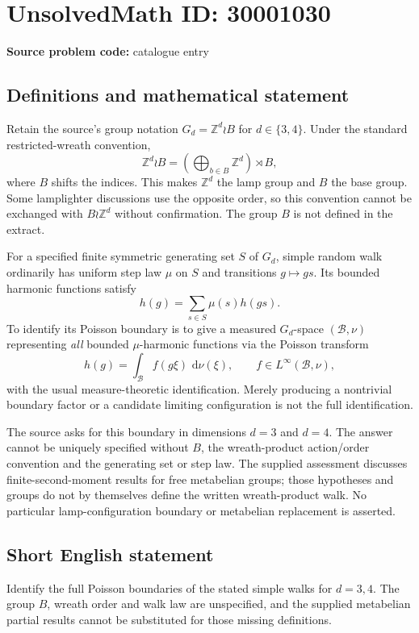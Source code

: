 \documentclass[11pt]{article}
\newcommand{\Z}{\mathbb{Z}}
\newcommand{\dd}{\,\mathrm{d}}
\begin{document}
\section*{UnsolvedMath ID: 30001030}
\textbf{Source problem code:} catalogue entry
\subsection{Definitions and mathematical statement}
Retain the source's group notation $G_d=\Z^d\wr B$ for $d\in\{3,4\}$. Under the standard restricted-wreath convention,
\[
\Z^d\wr B=\left(\bigoplus_{b\in B}\Z^d\right)\rtimes B,
\]
where $B$ shifts the indices. This makes $\Z^d$ the lamp group and $B$ the base group. Some lamplighter discussions use the opposite order, so this convention cannot be exchanged with $B\wr\Z^d$ without confirmation. The group $B$ is not defined in the extract.

For a specified finite symmetric generating set $S$ of $G_d$, simple random walk ordinarily has uniform step law $\mu$ on $S$ and transitions $g\mapsto gs$. Its bounded harmonic functions satisfy
\[
h(g)=\sum_{s\in S}\mu(s)h(gs).
\]
To identify its Poisson boundary is to give a measured $G_d$-space $(\mathcal B,\nu)$ representing \emph{all} bounded $\mu$-harmonic functions via the Poisson transform
\[
h(g)=\int_{\mathcal B}f(g\xi)\,\dd\nu(\xi),\qquad f\in L^\infty(\mathcal B,\nu),
\]
with the usual measure-theoretic identification. Merely producing a nontrivial boundary factor or a candidate limiting configuration is not the full identification.

The source asks for this boundary in dimensions $d=3$ and $d=4$. The answer cannot be uniquely specified without $B$, the wreath-product action/order convention and the generating set or step law. The supplied assessment discusses finite-second-moment results for free metabelian groups; those hypotheses and groups do not by themselves define the written wreath-product walk. No particular lamp-configuration boundary or metabelian replacement is asserted.
\subsection{Short English statement}
Identify the full Poisson boundaries of the stated simple walks for $d=3,4$. The group $B$, wreath order and walk law are unspecified, and the supplied metabelian partial results cannot be substituted for those missing definitions.
\end{document}
